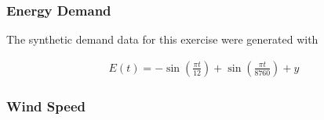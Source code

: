 \subsubsection{Energy Demand}
The synthetic demand data for this exercise were generated with

\begin{align}
    E(t) = -\sin\left(\frac{\pi t}{12}\right) + \sin\left(\frac{\pi t}{8760}\right) + y 
\end{align}

\subsubsection{Wind Speed}